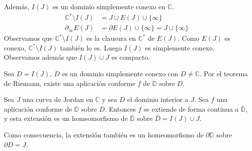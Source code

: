 Además, $I(J)$ es un dominio simplemente conexo en $\mathbb{C}$.
\begin{align*}
    \mathbb{C}^\ast \setminus I(J) & = J \cup E(J) \cup  \{\infty\}                      \\
    \partial_\infty E(J)           & = \partial E(J) \cup \{\infty\} = J \cup \{\infty\}
\end{align*}
Observamos que $\mathbb{C}^\ast \setminus I(J)$ es la clausura en $\mathbb{C}^\ast$ de $E(J)$.
Como $E(J)$ es conexo, $\mathbb{C}^\ast \setminus I(J)$ también lo es.
Luego $I(J)$ es simplemente conexo.
Observamos además que $I(J) \cup J$ es compacto.

Sea $D = I(J)$, $D$ es un dominio simplemente conexo con $D \neq \mathbb{C}$.
Por el teorema de Riemann, existe una aplicación conforme $f$ de $\mathbb{D}$ sobre $D$.

\begin{theorem}
    Sea $J$ una curva de Jordan en $\mathbb{C}$ y sea $D$ el dominio interior a $J$.
    Sea $f$ una aplicación conforme de $\mathbb{D}$ sobre $D$.
    Entonces $f$ se extiende de forma continua a $\bar{\mathbb{D}}$, y esta extensión es un homeomorfismo de $\bar{\mathbb{D}}$ sobre $\bar{D} = I(J) \cup J$.
\end{theorem}

\begin{remark}
    Como consecuencia, la extensión también es un homeomorfismo de $\partial\mathbb{D}$ sobre $\partial D = J$.
\end{remark}